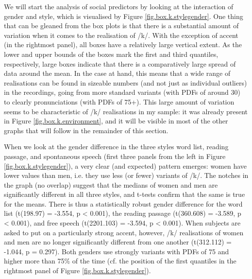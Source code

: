 We will start the analysis of social predictors by looking at the interaction of gender and style, which is visualised by Figure \ref{fig.box.k.stylegender}.
One thing that can be gleaned from the box plots is that there is a substantial amount of variation when it comes to the realisation of /k/.
With the exception of accent  (in the rightmost panel), all boxes have a relatively large vertical extent.
As the lower and upper bounds of the boxes mark the first and third quantiles, respectively, large boxes indicate that there is a comparatively large spread of data around the mean.
In the case at hand, this means that a wide range of realisations can be found in sizeable numbers (and not just as individual outliers) in the recordings, going from more standard variants (with PDFs of around 30) to clearly  pronunciations (with PDFs of 75+).
This large amount of variation seems to be characteristic of /k/ realisations in my sample: it was already present in Figure \ref{fig.box.k.environment}, and it will be visible in most of the other graphs that will follow in the remainder of this section.

When we look at the gender difference in the three styles word list, reading passage, and spontaneous speech (first three panels from the left in Figure \ref{fig.box.k.stylegender}), a very clear (and expected) pattern emerges: women have lower  values than men, i.e. they use less (or fewer)  variants of /k/.
The notches in the graph (no overlap) suggest that the medians of women and men are significantly different in all three styles, and t-tests confirm that the same is true for the means.
There is thus a statistically robust gender difference for the word list (t(198.97) = -3.554, p < 0.001), the reading passage (t(360.608) = -3.589, p < 0.001), and free speech (t(2201.103) = -3.594, p < 0.001).
When subjects are asked to put on a particularly strong  accent, however, /k/ realisations of women and men are no longer significantly different from one another (t(312.112) = -1.044, p = 0.297).
Both genders use strongly  variants with PDFs of 75 and higher more than 75\% of the time (cf. the position of the first quantiles in the rightmost panel of Figure \ref{fig.box.k.stylegender}).

